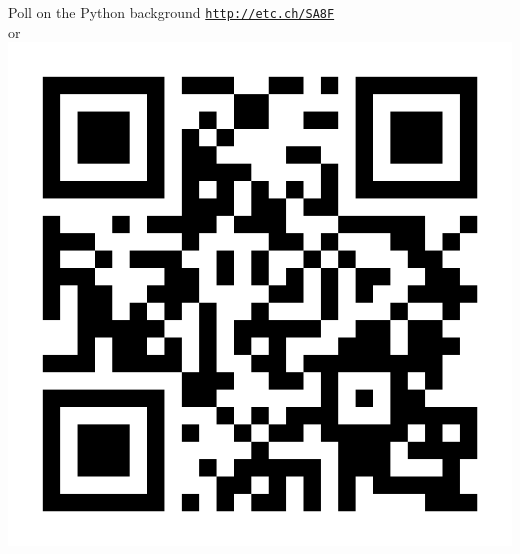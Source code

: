 \begin{frame}{Poll on the Python background}
\centering 
\vskip 10pt
{\Large \href{http://etc.ch/SA8F}{\textcolor{indigo(dye)}{\tt http://etc.ch/SA8F}}}\\ 
or \\[10pt]
\includegraphics[height=0.4\columnwidth]{figures/intro/poll-python-background.png}
\end{frame}

